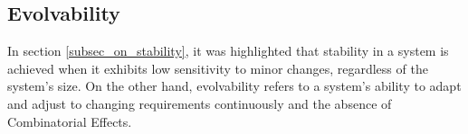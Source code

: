\subsection{Evolvability} \label{sec_on_evolvability}

In section \ref{subsec_on_stability}, it was highlighted that stability in a system is
achieved when it exhibits low sensitivity to minor changes, regardless of the system's
size. On the other hand, evolvability refers to a system's ability to adapt and adjust to
changing requirements continuously and the absence of Combinatorial Effects.